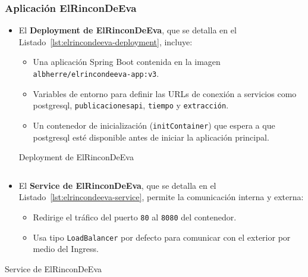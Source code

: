 \subsubsection*{Aplicación ElRinconDeEva}
\begin{itemize}
  \item El \textbf{Deployment de ElRinconDeEva}, que se detalla en el Listado~\ref{lst:elrincondeeva-deployment}, incluye:
  \begin{itemize}
    \item Una aplicación Spring Boot contenida en la imagen \texttt{albherre/elrincondeeva-app:v3}.
    \item Variables de entorno para definir las URLs de conexión a servicios como \gls{postgresql}, \texttt{publicacionesapi}, \texttt{tiempo} y \texttt{extracción}.
    \item Un contenedor de inicialización (\texttt{initContainer}) que espera a que \gls{postgresql} esté disponible antes de iniciar la aplicación principal.
  \end{itemize}
  \begin{longlisting}
\caption{Deployment de ElRinconDeEva}
\inputminted[firstline=176,lastline=216]{yaml}{../backend/despliegue/kubernetes/despliegue.yaml}
\label{lst:elrincondeeva-deployment}
\end{longlisting}
  \item El \textbf{Service de ElRinconDeEva}, que se detalla en el Listado~\ref{lst:elrincondeeva-service}, permite la comunicación interna y externa:
  \begin{itemize}
    \item Redirige el tráfico del puerto \texttt{80} al \texttt{8080} del contenedor.
    \item Usa tipo \texttt{LoadBalancer} por defecto para comunicar con el exterior por medio del Ingress.
  \end{itemize}
\end{itemize}

\begin{longlisting}
\caption{Service de ElRinconDeEva}
\inputminted[firstline=219,lastline=229]{yaml}{../backend/despliegue/kubernetes/despliegue.yaml}
\label{lst:elrincondeeva-service}
\end{longlisting}

